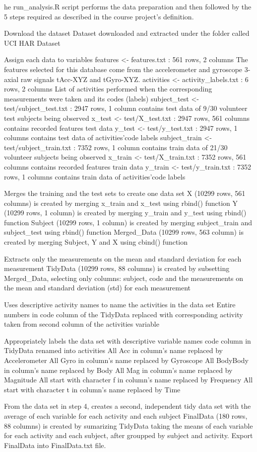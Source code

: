 \documentclass[
]{article}
\author{}
\date{\vspace{-2.5em}}
\begin{document}
he run\_analysis.R script performs the data preparation and then
followed by the 5 steps required as described in the course project's
definition.

Download the dataset Dataset downloaded and extracted under the folder
called UCI HAR Dataset

Assign each data to variables features \textless- features.txt : 561
rows, 2 columns The features selected for this database come from the
accelerometer and gyroscope 3-axial raw signals tAcc-XYZ and tGyro-XYZ.
activities \textless- activity\_labels.txt : 6 rows, 2 columns List of
activities performed when the corresponding measurements were taken and
its codes (labels) subject\_test \textless- test/subject\_test.txt :
2947 rows, 1 column contains test data of 9/30 volunteer test subjects
being observed x\_test \textless- test/X\_test.txt : 2947 rows, 561
columns contains recorded features test data y\_test \textless-
test/y\_test.txt : 2947 rows, 1 columns contains test data of
activities'code labels subject\_train \textless- test/subject\_train.txt
: 7352 rows, 1 column contains train data of 21/30 volunteer subjects
being observed x\_train \textless- test/X\_train.txt : 7352 rows, 561
columns contains recorded features train data y\_train \textless-
test/y\_train.txt : 7352 rows, 1 columns contains train data of
activities'code labels

Merges the training and the test sets to create one data set X (10299
rows, 561 columns) is created by merging x\_train and x\_test using
rbind() function Y (10299 rows, 1 column) is created by merging y\_train
and y\_test using rbind() function Subject (10299 rows, 1 column) is
created by merging subject\_train and subject\_test using rbind()
function Merged\_Data (10299 rows, 563 column) is created by merging
Subject, Y and X using cbind() function

Extracts only the measurements on the mean and standard deviation for
each measurement TidyData (10299 rows, 88 columns) is created by
subsetting Merged\_Data, selecting only columns: subject, code and the
measurements on the mean and standard deviation (std) for each
measurement

Uses descriptive activity names to name the activities in the data set
Entire numbers in code column of the TidyData replaced with
corresponding activity taken from second column of the activities
variable

Appropriately labels the data set with descriptive variable names code
column in TidyData renamed into activities All Acc in column's name
replaced by Accelerometer All Gyro in column's name replaced by
Gyroscope All BodyBody in column's name replaced by Body All Mag in
column's name replaced by Magnitude All start with character f in
column's name replaced by Frequency All start with character t in
column's name replaced by Time

From the data set in step 4, creates a second, independent tidy data set
with the average of each variable for each activity and each subject
FinalData (180 rows, 88 columns) is created by sumarizing TidyData
taking the means of each variable for each activity and each subject,
after groupped by subject and activity. Export FinalData into
FinalData.txt file.
\end{document}
